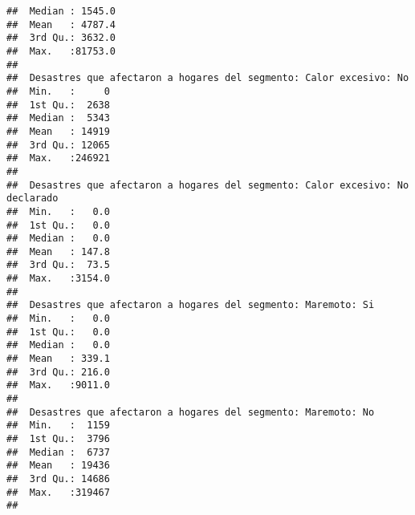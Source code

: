 \documentclass[11pt,]{article}
\begin{document}
\begin{verbatim}
##  Median : 1545.0                                                   
##  Mean   : 4787.4                                                   
##  3rd Qu.: 3632.0                                                   
##  Max.   :81753.0                                                   
##                                                                    
##  Desastres que afectaron a hogares del segmento: Calor excesivo: No
##  Min.   :     0                                                    
##  1st Qu.:  2638                                                    
##  Median :  5343                                                    
##  Mean   : 14919                                                    
##  3rd Qu.: 12065                                                    
##  Max.   :246921                                                    
##                                                                    
##  Desastres que afectaron a hogares del segmento: Calor excesivo: No declarado
##  Min.   :   0.0                                                              
##  1st Qu.:   0.0                                                              
##  Median :   0.0                                                              
##  Mean   : 147.8                                                              
##  3rd Qu.:  73.5                                                              
##  Max.   :3154.0                                                              
##                                                                              
##  Desastres que afectaron a hogares del segmento: Maremoto: Si
##  Min.   :   0.0                                              
##  1st Qu.:   0.0                                              
##  Median :   0.0                                              
##  Mean   : 339.1                                              
##  3rd Qu.: 216.0                                              
##  Max.   :9011.0                                              
##                                                              
##  Desastres que afectaron a hogares del segmento: Maremoto: No
##  Min.   :  1159                                              
##  1st Qu.:  3796                                              
##  Median :  6737                                              
##  Mean   : 19436                                              
##  3rd Qu.: 14686                                              
##  Max.   :319467                                              
##                                                              

\end{verbatim}
\end{document}
